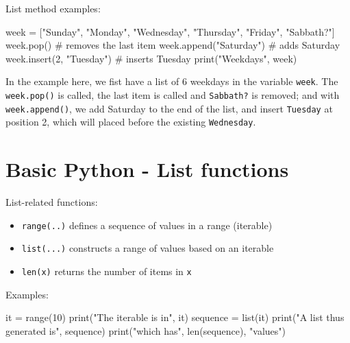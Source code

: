 \documentclass[
  letterpaper,
]{scrbook}
\newenvironment{Shaded}{\begin{snugshade}}{\end{snugshade}}
\newcommand{\BuiltInTok}[1]{\textcolor[rgb]{0.00,0.23,0.31}{#1}}
\newcommand{\CommentTok}[1]{\textcolor[rgb]{0.37,0.37,0.37}{#1}}
\newcommand{\DecValTok}[1]{\textcolor[rgb]{0.68,0.00,0.00}{#1}}
\newcommand{\NormalTok}[1]{\textcolor[rgb]{0.00,0.23,0.31}{#1}}
\newcommand{\OperatorTok}[1]{\textcolor[rgb]{0.37,0.37,0.37}{#1}}
\newcommand{\StringTok}[1]{\textcolor[rgb]{0.13,0.47,0.30}{#1}}
\providecommand{\tightlist}{%
  \setlength{\itemsep}{0pt}\setlength{\parskip}{0pt}}
\begin{document}
List method examples:

\begin{Shaded}
\begin{Highlighting}[]
\NormalTok{week }\OperatorTok{=}\NormalTok{ [}\StringTok{"Sunday"}\NormalTok{, }\StringTok{"Monday"}\NormalTok{, }\StringTok{"Wednesday"}\NormalTok{, }\StringTok{"Thursday"}\NormalTok{, }\StringTok{"Friday"}\NormalTok{, }\StringTok{"Sabbath?"}\NormalTok{]}
\NormalTok{week.pop()                 }\CommentTok{\# removes the last item}
\NormalTok{week.append(}\StringTok{"Saturday"}\NormalTok{)    }\CommentTok{\# adds Saturday}
\NormalTok{week.insert(}\DecValTok{2}\NormalTok{, }\StringTok{"Tuesday"}\NormalTok{)  }\CommentTok{\# inserts Tuesday}
\BuiltInTok{print}\NormalTok{(}\StringTok{"Weekdays"}\NormalTok{, week)}
\end{Highlighting}
\end{Shaded}

In the example here, we fist have a list of 6 weekdays in the variable
\texttt{week}. The \texttt{week.pop()} is called, the last item is
called and \texttt{Sabbath?} is removed; and with
\texttt{week.append()}, we add Saturday to the end of the list, and
insert \texttt{Tuesday} at position 2, which will placed before the
existing \texttt{Wednesday}.

\section*{Basic Python - List
functions}\label{basic-python---list-functions}


List-related functions:

\begin{itemize}
\tightlist
\item
  \texttt{range(..)} defines a sequence of values in a range (iterable)
\item
  \texttt{list(...)} constructs a range of values based on an iterable
\item
  \texttt{len(x)} returns the number of items in \texttt{x}
\end{itemize}

Examples:

\begin{Shaded}
\begin{Highlighting}[]
\NormalTok{it }\OperatorTok{=} \BuiltInTok{range}\NormalTok{(}\DecValTok{10}\NormalTok{)}
\BuiltInTok{print}\NormalTok{(}\StringTok{"The iterable is in"}\NormalTok{, it)}
\NormalTok{sequence }\OperatorTok{=} \BuiltInTok{list}\NormalTok{(it) }
\BuiltInTok{print}\NormalTok{(}\StringTok{"A list thus generated is"}\NormalTok{, sequence)}
\BuiltInTok{print}\NormalTok{(}\StringTok{"which has"}\NormalTok{, }\BuiltInTok{len}\NormalTok{(sequence), }\StringTok{"values"}\NormalTok{)}
\end{Highlighting}
\end{Shaded}
\end{document}
